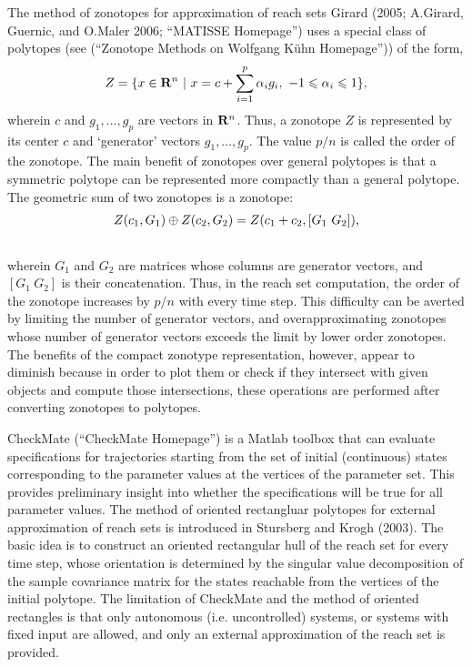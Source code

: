 \documentclass[letterpaper,10pt,english]{sphinxmanual}
\begin{document}
The method of zonotopes for approximation of reach sets Girard (2005;
A.Girard, Guernic, and O.Maler 2006; “MATISSE Homepage”) uses a special
class of polytopes (see (“Zonotope Methods on Wolfgang Kühn Homepage”))
of the form,
\begin{gather}
\begin{split}Z=\{x \in {\bf R}^n ~|~
x=c+\sum_{i=1}^p\alpha_ig_i,~ -1\leqslant\alpha_i\leqslant1\},\end{split}\notag
\end{gather}
wherein $c$ and $g_1, ..., g_p$ are vectors in
${\bf R}^n$. Thus, a zonotope $Z$ is represented by its
center $c$ and ‘generator’ vectors $g_1, ..., g_p$. The
value $p/n$ is called the order of the zonotope. The main benefit
of zonotopes over general polytopes is that a symmetric polytope can be
represented more compactly than a general polytope. The geometric sum of
two zonotopes is a zonotope:
\begin{gather}
\begin{split}Z(c_1, G_1)\oplus Z(c_2, G_2) = Z(c_1+c_2, [G_1 ~ G_2]),\end{split}\notag\\\begin{split}\end{split}\notag
\end{gather}
wherein $G_1$ and $G_2$ are matrices whose columns are
generator vectors, and $[G_1 ~ G_2]$ is their concatenation. Thus,
in the reach set computation, the order of the zonotope increases by
$p/n$ with every time step. This difficulty can be averted by
limiting the number of generator vectors, and overapproximating
zonotopes whose number of generator vectors exceeds the limit by lower
order zonotopes. The benefits of the compact zonotype representation,
however, appear to diminish because in order to plot them or check if
they intersect with given objects and compute those intersections, these
operations are performed after converting zonotopes to polytopes.

CheckMate (“CheckMate Homepage”) is a Matlab toolbox that can evaluate
specifications for trajectories starting from the set of initial
(continuous) states corresponding to the parameter values at the
vertices of the parameter set. This provides preliminary insight into
whether the specifications will be true for all parameter values. The
method of oriented rectangluar polytopes for external approximation of
reach sets is introduced in Stursberg and Krogh (2003). The basic idea
is to construct an oriented rectangular hull of the reach set for every
time step, whose orientation is determined by the singular value
decomposition of the sample covariance matrix for the states reachable
from the vertices of the initial polytope. The limitation of CheckMate
and the method of oriented rectangles is that only autonomous (i.e.
uncontrolled) systems, or systems with fixed input are allowed, and only
an external approximation of the reach set is provided.
\end{document}
